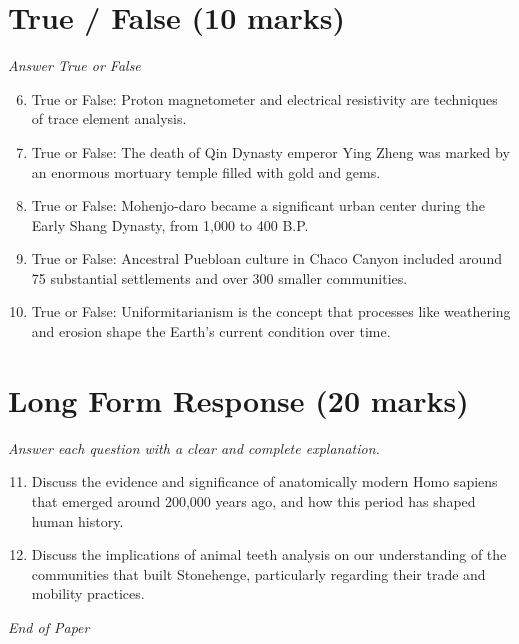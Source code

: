 \documentclass[12pt]{article}
\begin{document}
\section*{True / False (10 marks)}
\textit{Answer True or False}
\begin{enumerate}[label=\arabic*.]
\setcounter{enumi}{5}
\item True or False: Proton magnetometer and electrical resistivity are techniques of trace element analysis.
\item True or False: The death of Qin Dynasty emperor Ying Zheng was marked by an enormous mortuary temple filled with gold and gems.
\item True or False: Mohenjo-daro became a significant urban center during the Early Shang Dynasty, from 1,000 to 400 B.P.
\item True or False: Ancestral Puebloan culture in Chaco Canyon included around 75 substantial settlements and over 300 smaller communities.
\item True or False: Uniformitarianism is the concept that processes like weathering and erosion shape the Earth's current condition over time.
\end{enumerate}

\section*{Long Form Response (20 marks)}
\textit{Answer each question with a clear and complete explanation.}
\begin{enumerate}[label=\arabic*.]
\setcounter{enumi}{10}
\item Discuss the evidence and significance of anatomically modern Homo sapiens that emerged
around 200,000 years ago, and how this period has shaped human history.
\item Discuss the implications of animal teeth analysis on our understanding of the communities
that built Stonehenge, particularly regarding their trade and mobility practices.
\end{enumerate}

\vfill
\noindent\textit{End of Paper}
\end{document}

